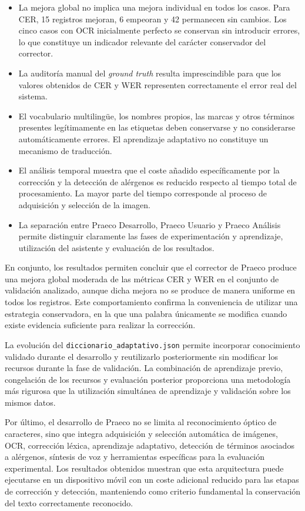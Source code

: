 \begin{itemize}
	\item La mejora global no implica una mejora individual en todos los casos. Para CER, 15 registros mejoran, 6 empeoran y 42 permanecen sin cambios. Los cinco casos con OCR inicialmente perfecto se conservan sin introducir errores, lo que constituye un indicador relevante del carácter conservador del corrector.
	
	\item La auditoría manual del \textit{ground truth} resulta imprescindible para que los valores obtenidos de CER y WER representen correctamente el error real del sistema.
	
	\item El vocabulario multilingüe, los nombres propios, las marcas y otros términos presentes legítimamente en las etiquetas deben conservarse y no considerarse automáticamente errores. El aprendizaje adaptativo no constituye un mecanismo de traducción.
	
	\item El análisis temporal muestra que el coste añadido específicamente por la corrección y la detección de alérgenos es reducido respecto al tiempo total de procesamiento. La mayor parte del tiempo corresponde al proceso de adquisición y selección de la imagen.
	
	\item La separación entre Praeco Desarrollo, Praeco Usuario y Praeco Análisis permite distinguir claramente las fases de experimentación y aprendizaje, utilización del asistente y evaluación de los resultados.
	
\end{itemize}

En conjunto, los resultados permiten concluir que el corrector de Praeco produce una mejora global moderada de las métricas CER y WER en el conjunto de validación analizado, aunque dicha mejora no se produce de manera uniforme en todos los registros. Este comportamiento confirma la conveniencia de utilizar una estrategia conservadora, en la que una palabra únicamente se modifica cuando existe evidencia suficiente para realizar la corrección.

La evolución del \texttt{diccionario\_adaptativo.json} permite incorporar conocimiento validado durante el desarrollo y reutilizarlo posteriormente sin modificar los recursos durante la fase de validación. La combinación de aprendizaje previo, congelación de los recursos y evaluación posterior proporciona una metodología más rigurosa que la utilización simultánea de aprendizaje y validación sobre los mismos datos.

Por último, el desarrollo de Praeco no se limita al reconocimiento óptico de caracteres, sino que integra adquisición y selección automática de imágenes, OCR, corrección léxica, aprendizaje adaptativo, detección de términos asociados a alérgenos, síntesis de voz y herramientas específicas para la evaluación experimental. Los resultados obtenidos muestran que esta arquitectura puede ejecutarse en un dispositivo móvil con un coste adicional reducido para las etapas de corrección y detección, manteniendo como criterio fundamental la conservación del texto correctamente reconocido.

